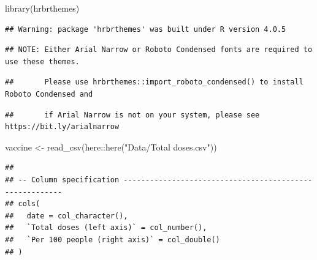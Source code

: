 \documentclass[11pt,a4paper,]{article}
\newenvironment{Shaded}{\begin{snugshade}}{\end{snugshade}}
\newcommand{\FunctionTok}[1]{\textcolor[rgb]{0.00,0.00,0.00}{#1}}
\newcommand{\NormalTok}[1]{#1}
\newcommand{\OtherTok}[1]{\textcolor[rgb]{0.56,0.35,0.01}{#1}}
\newcommand{\SpecialCharTok}[1]{\textcolor[rgb]{0.00,0.00,0.00}{#1}}
\newcommand{\StringTok}[1]{\textcolor[rgb]{0.31,0.60,0.02}{#1}}
\begin{document}
\begin{Shaded}
\begin{Highlighting}[]
\FunctionTok{library}\NormalTok{(hrbrthemes)}
\end{Highlighting}
\end{Shaded}

\begin{verbatim}
## Warning: package 'hrbrthemes' was built under R version 4.0.5
\end{verbatim}

\begin{verbatim}
## NOTE: Either Arial Narrow or Roboto Condensed fonts are required to use these themes.
\end{verbatim}

\begin{verbatim}
##       Please use hrbrthemes::import_roboto_condensed() to install Roboto Condensed and
\end{verbatim}

\begin{verbatim}
##       if Arial Narrow is not on your system, please see https://bit.ly/arialnarrow
\end{verbatim}

\begin{Shaded}
\begin{Highlighting}[]
\NormalTok{vaccine }\OtherTok{\textless{}{-}} \FunctionTok{read\_csv}\NormalTok{(here}\SpecialCharTok{::}\FunctionTok{here}\NormalTok{(}\StringTok{"Data/Total doses.csv"}\NormalTok{))}
\end{Highlighting}
\end{Shaded}

\begin{verbatim}
## 
## -- Column specification --------------------------------------------------------
## cols(
##   date = col_character(),
##   `Total doses (left axis)` = col_number(),
##   `Per 100 people (right axis)` = col_double()
## )
\end{verbatim}
\end{document}
